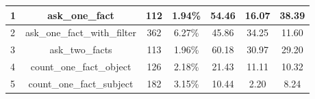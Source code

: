 \begin{table}[h!]
{\begin{tabular}{|l|c|cc|cc|c|}
    1                            & ask\_one\_fact                                                                                                         & 112                                                 & 1.94\%                                                                          & 54.46                                                                                                      & 16.07                                                                                  & 38.39                                                                              \\ \hline
    2                            & ask\_one\_fact\_with\_filter                                                                                           & 362                                                 & 6.27\%                                                                          & 45.86                                                                                                      & 34.25                                                                                  & 11.60                                                                              \\ \hline
    3                            & ask\_two\_facts                                                                                                        & 113                                                 & 1.96\%                                                                          & 60.18                                                                                                      & 30.97                                                                                  & 29.20                                                                              \\ \hline
    4                            & count\_one\_fact\_object                                                                                               & 126                                                 & 2.18\%                                                                          & 21.43                                                                                                      & 11.11                                                                                  & 10.32                                                                              \\ \hline
    5                            & count\_one\_fact\_subject                                                                                              & 182                                                 & 3.15\%                                                                          & 10.44                                                                                                      & 2.20                                                                                   & 8.24                                                                               \\ \hline

\end{tabular}}
\end{table}
